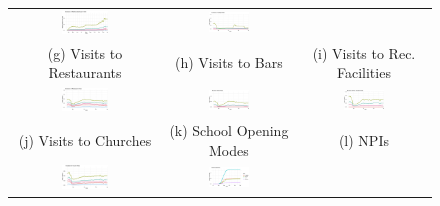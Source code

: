 \documentclass[9pt,twoside,lineno]{pnas-new}
\theoremstyle{definition}
\begin{document}
\begin{figure}[!ht]
{\begin{minipage}{\linewidth}
\begin{tabular}{ccc}
      \includegraphics[width=0.33\textwidth]{tables_and_figures/nyt-ddeath_capita}&
  \includegraphics[width=0.33\textwidth]{tables_and_figures/sg-college}\\  
  (g) Visits to Restaurants & (h) Visits to Bars & (i) Visits to Rec. Facilities\\
  \includegraphics[width=0.33\textwidth]{tables_and_figures/sg-restaurant}&
  \includegraphics[width=0.33\textwidth]{tables_and_figures/sg-bar}&
  \includegraphics[width=0.33\textwidth]{tables_and_figures/sg-gym}\\
   (j) Visits to Churches&(k) School Opening Modes & (l) NPIs\\ 
  \includegraphics[width=0.33\textwidth]{tables_and_figures/sg-church}&  \includegraphics[width=0.33\textwidth]{tables_and_figures/ew-opening}&

\end{tabular}
\end{minipage}}
\end{figure}
\end{document}
